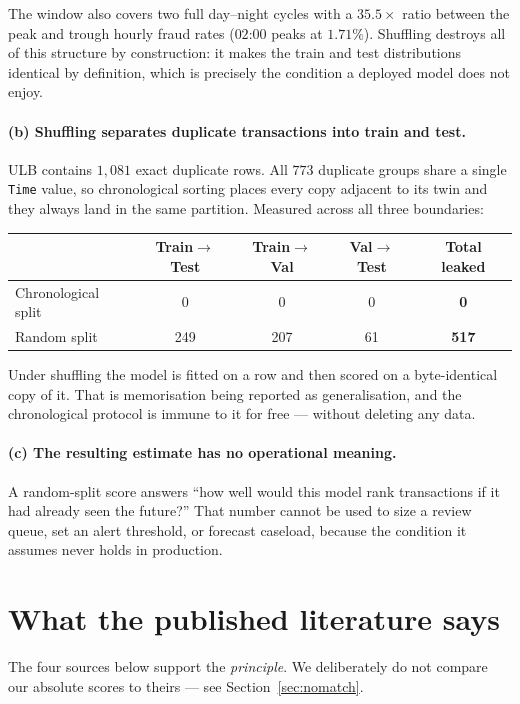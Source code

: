 \documentclass[11pt,a4paper]{article}
\newcommand{\code}[1]{\texttt{\small #1}}
\newcommand{\hi}[1]{\textbf{\textcolor{accent}{#1}}}
\begin{document}
\noindent The window also covers two full day--night cycles with a $35.5\times$ ratio between
the peak and trough hourly fraud rates ($02$:$00$ peaks at $1.71\%$). Shuffling destroys all of
this structure by construction: it makes the train and test distributions identical by
definition, which is precisely the condition a deployed model does not enjoy.

\paragraph{(b) Shuffling separates duplicate transactions into train and test.}
ULB contains $1{,}081$ exact duplicate rows. All $773$ duplicate groups share a single
\code{Time} value, so chronological sorting places every copy adjacent to its twin and they
always land in the same partition. Measured across all three boundaries:

\begin{center}\small
\begin{tabular}{lcccc}
      \toprule
      & Train$\to$Test & Train$\to$Val & Val$\to$Test & Total leaked\\
      \midrule
      Chronological split & 0 & 0 & 0 & \hi{0}\\
      Random split & 249 & 207 & 61 & \hi{517}\\
      \bottomrule
\end{tabular}
\end{center}

\noindent Under shuffling the model is fitted on a row and then scored on a byte-identical copy
of it. That is memorisation being reported as generalisation, and the chronological protocol is
immune to it for free --- without deleting any data.

\paragraph{(c) The resulting estimate has no operational meaning.}
A random-split score answers ``how well would this model rank transactions if it had already
seen the future?'' That number cannot be used to size a review queue, set an alert threshold, or
forecast caseload, because the condition it assumes never holds in production.

\section{What the published literature says}
The four sources below support the \emph{principle}. We deliberately do not compare our absolute
scores to theirs --- see Section~\ref{sec:nomatch}.
\end{document}
